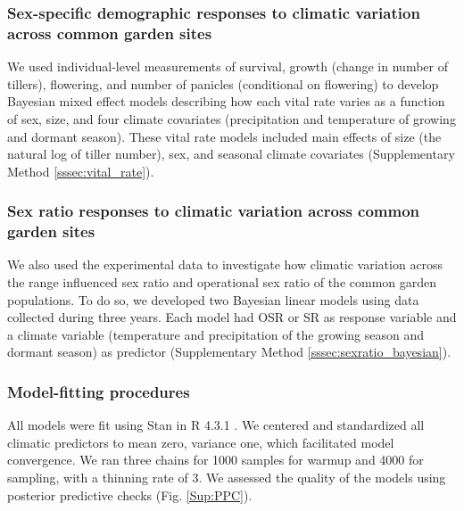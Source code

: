 \documentclass[12pt]{article}\usepackage[]{graphicx}\usepackage[dvipsnames]{xcolor}
\newcommand{\tom}[2]{{\color{red}{#1}}\footnote{\textit{\color{red}{#2}}}}
\begin{document}
\subsubsection*{Sex-specific demographic responses to climatic variation across common garden sites}
We used individual-level measurements of survival, growth (change in number of tillers), flowering, and number of panicles (conditional on flowering) to develop Bayesian mixed effect models describing how each vital rate varies as a function of sex, size, and four climate covariates (precipitation and temperature of growing and dormant season). 
These vital rate models included main effects of size (the natural log of tiller number), sex, and seasonal climate covariates (Supplementary Method \ref{sssec:vital_rate}). 

\subsubsection*{Sex ratio responses to climatic variation across common garden sites}
We also used the experimental data to investigate how climatic variation across the range influenced sex ratio and operational sex ratio of the common garden populations. 
To do so, we developed  two Bayesian linear models using  data collected during three years.
Each model had OSR or SR as response variable and a climate variable (temperature and precipitation of the growing season and dormant season) as predictor (Supplementary Method \ref{sssec:sexratio_bayesian}). 


\subsubsection*{Model-fitting procedures}
All models were fit using Stan \citep{rstan} in R 4.3.1 \citep{RCoreteam}.
We centered and standardized all climatic predictors to mean zero, variance one, which facilitated model convergence.
We ran three chains for 1000 samples for warmup and 4000 for sampling, with a thinning rate of 3.
We assessed the quality of the models using posterior predictive checks \citep{piironen2017comparison} (Fig. \ref{Sup:PPC}).
 
\end{document}
